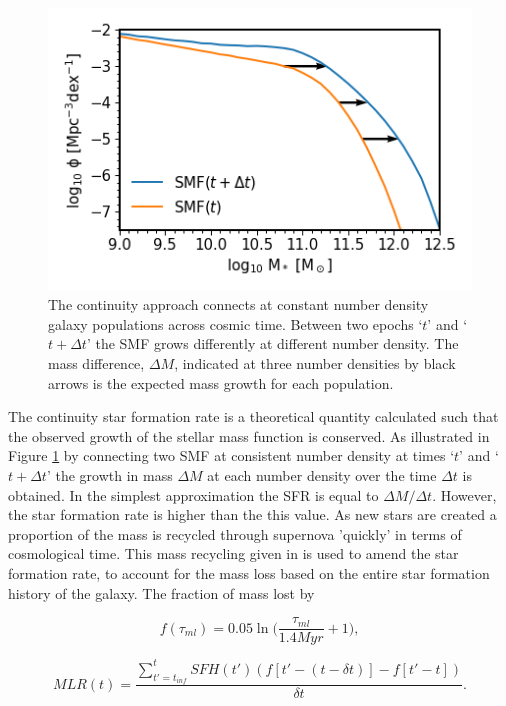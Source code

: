 \begin{figure}[h]
	\centering
	\includegraphics[width = \linewidth]{Figures/Chapter2/ContinuityEqn.png}
    \caption{The continuity approach connects at constant number density galaxy populations across cosmic time. Between two epochs `$t$' and `$t + \Delta t$' the SMF grows differently at different number density. The mass difference, $\Delta M$, indicated at three number densities by black arrows is the expected mass growth for each population.}
	\label{fig:Cont_Eqn}
\end{figure}

The continuity star formation rate is a theoretical quantity calculated such that the observed growth of the stellar mass function is conserved. As illustrated in Figure \ref{fig:Cont_Eqn} by connecting two SMF at consistent number density at times `$t$' and `$t + \Delta t$' the growth in mass $\Delta M$ at each number density over the time $\Delta t$ is obtained. In the simplest approximation the SFR is equal to $\Delta M / \Delta t$. However, the star formation rate is higher than the this value. As new stars are created a proportion of the mass is recycled through supernova 'quickly' in terms of cosmological time. This mass recycling given in \citet{Moster2018Emerge10} is used to amend the star formation rate, to account for the mass loss based on the entire star formation history of the galaxy. The fraction of mass lost by 

\begin{equation}
\label{eqn:f_ml}
f(\tau_{ml}) = 0.05 \ln \Big(\frac{\tau_{ml}}{1.4 Myr}+1\Big) ,
\end{equation}

\begin{equation}
\label{eqn:MLR}
MLR(t) = \frac{ \sum_{t' = t_{inf}}^{t} SFH(t')(f[t' - (t-\delta t)]-f[t' - t]) }{\delta t} .
\end{equation}

